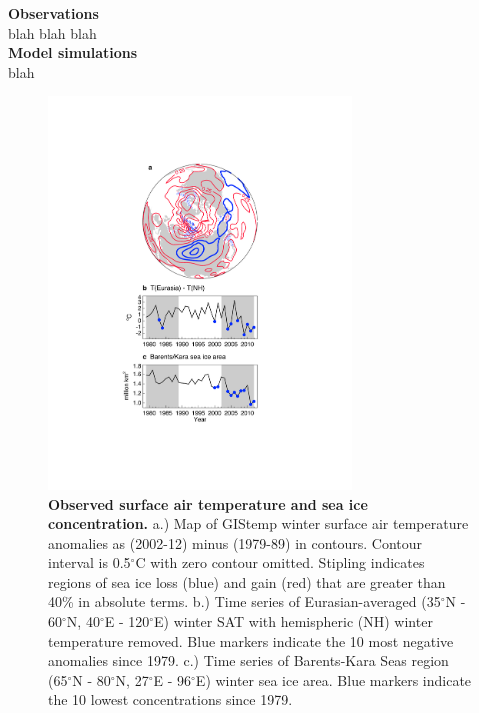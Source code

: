 \documentclass{nature}
\begin{document}
\begin{methods}
\textbf{Observations} \\
blah blah blah
\\
\textbf{Model simulations}\\
blah
\end{methods}

\begin{figure}%
\centering
\noindent\includegraphics[width=19pc]{Word/Figure_1.pdf}
\caption{\textbf{Observed surface air temperature and sea ice concentration.} a.) Map of GIStemp winter surface air temperature anomalies as (2002-12) minus (1979-89) in contours. Contour interval is 0.5$^\circ$C with zero contour omitted. Stipling indicates regions of sea ice loss (blue) and gain (red) that are greater than 40\% in absolute terms. b.) Time series of Eurasian-averaged (35$^\circ$N - 60$^\circ$N, 40$^\circ$E - 120$^\circ$E) winter SAT with hemispheric (NH) winter temperature removed. Blue markers indicate the 10 most negative anomalies since 1979. c.) Time series of Barents-Kara Seas region (65$^\circ$N - 80$^\circ$N, 27$^\circ$E - 96$^\circ$E) winter sea ice area. Blue markers indicate the 10 lowest concentrations since 1979.
}
\label{fig:fig1} 
\end{figure}
\end{document}
